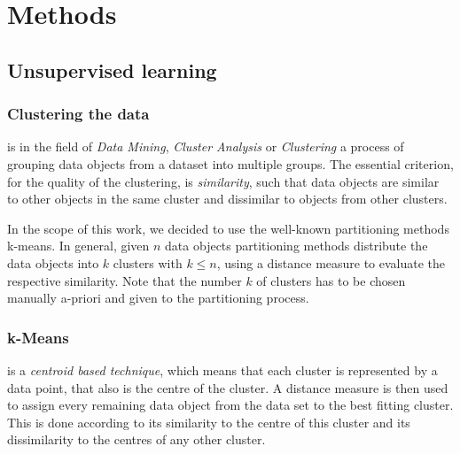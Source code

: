 \section{Methods}
	
	
	
	\subsection{Unsupervised learning}
	\subsubsection{Clustering the data}
	
	is in the field of \textit{Data Mining}, \textit{Cluster Analysis} or \textit{Clustering} a process of grouping data objects from a dataset into multiple groups. The essential criterion, for the quality of the clustering, is \textit{similarity}, such that data objects are similar to other objects in the same cluster and dissimilar to objects from other clusters. 
	
	In the scope of this work, we decided to use the well-known partitioning methods k-means. In general, given $n$ data objects partitioning methods distribute the data objects into $k$ clusters with $k\le n$, using a distance measure to evaluate the respective similarity. 
	Note that the number $k$ of clusters has to be chosen manually a-priori and given to the partitioning process.
	
	\subsubsection{k-Means}
	
	is a \textit{centroid based technique}, which means that each cluster is represented by a data point, that also is the centre of the cluster. A distance measure is then used to assign every remaining data object from the data set to the best fitting cluster. This is done according to its similarity to the centre of this cluster and its dissimilarity to the centres of any other cluster.
	
